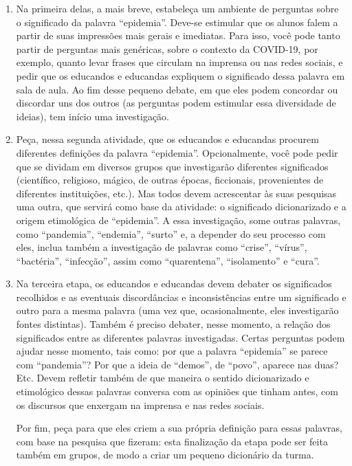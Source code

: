 \documentclass[12pt]{extarticle}
\begin{document}
\begin{enumerate}
\item Na primeira delas, a mais breve,
estabeleça um ambiente de perguntas sobre o significado da palavra
``epidemia''. Deve-se estimular que os alunos falem a partir de suas
impressões mais gerais e imediatas. Para isso, você pode tanto partir de
perguntas mais genéricas, sobre o contexto da COVID-19, por exemplo,
quanto levar frases que circulam na imprensa ou nas redes sociais, e
pedir que os educandos e educandas expliquem o significado dessa palavra
em sala de aula. Ao fim desse pequeno debate, em que eles podem
concordar ou discordar uns dos outros (as perguntas podem estimular essa
diversidade de ideias), tem início uma investigação.

\item Peça, nessa segunda atividade, que os educandos e educandas procurem
diferentes definições da palavra ``epidemia''. Opcionalmente, você pode
pedir que se dividam em diversos grupos que investigarão diferentes
significados (científico, religioso, mágico, de outras épocas,
ficcionais, provenientes de diferentes instituições, etc.). Mas todos
devem acrescentar às suas pesquisas uma outra, que servirá como base da
atividade: o significado dicionarizado e a origem etimológica de
``epidemia''. A essa investigação, some outras palavras, como
``pandemia'', ``endemia'', ``surto'' e, a depender do seu processo com
eles, inclua também a investigação de palavras como ``crise'',
``vírus'', ``bactéria'', ``infecção'', assim como ``quarentena'',
``isolamento'' e ``cura''.

\item Na terceira etapa, os educandos e educandas devem debater os
significados recolhidos e as eventuais discordâncias e inconsistências
entre um significado e outro para a mesma palavra (uma vez que,
ocasionalmente, eles investigarão fontes distintas). Também é preciso
debater, nesse momento, a relação dos significados entre as diferentes
palavras investigadas. Certas perguntas podem ajudar nesse momento, tais
como: por que a palavra ``epidemia'' se parece com ``pandemia''? Por que
a ideia de ``demos'', de ``povo'', aparece nas duas? Etc. Devem refletir
também de que maneira o sentido dicionarizado e etimológico dessas
palavras conversa com as opiniões que tinham antes, com os discursos que
enxergam na imprensa e nas redes sociais.

Por fim, peça para que eles criem a sua própria definição para essas
palavras, com base na pesquisa que fizeram: esta finalização da etapa
pode ser feita também em grupos, de modo a criar um pequeno dicionário
da turma.
\end{enumerate}
\end{document}
